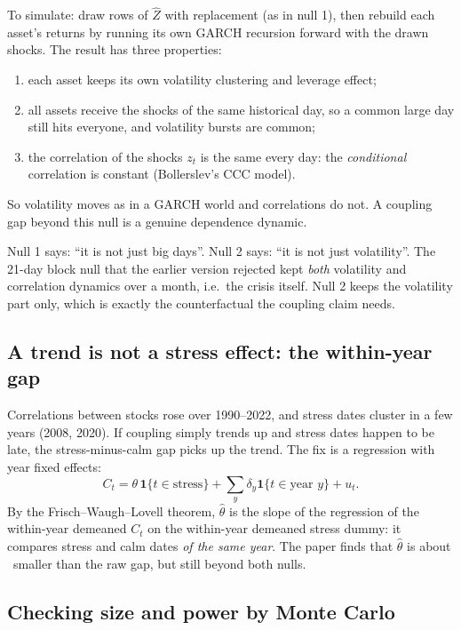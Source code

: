 To simulate: draw rows of $\hat Z$ with replacement (as in null 1), then
rebuild each asset's returns by running its own GARCH recursion forward with
the drawn shocks. The result has three properties:
\begin{enumerate}
\item each asset keeps its own volatility clustering and leverage effect;
\item all assets receive the shocks of the same historical day, so a common
large day still hits everyone, and volatility bursts are common;
\item the correlation of the shocks $z_t$ is the same every day: the
\emph{conditional} correlation is constant (Bollerslev's CCC model).
\end{enumerate}
So volatility moves as in a GARCH world and correlations do not. A coupling
gap beyond this null is a genuine dependence dynamic.

\begin{intuition}
Null 1 says: ``it is not just big days''. Null 2 says: ``it is not just
volatility''. The 21-day block null that the earlier version rejected kept
\emph{both} volatility and correlation dynamics over a month, i.e.\ the crisis
itself. Null 2 keeps the volatility part only, which is exactly the
counterfactual the coupling claim needs.
\end{intuition}

\subsection{A trend is not a stress effect: the within-year gap}

Correlations between stocks rose over 1990--2022, and stress dates cluster in
a few years (2008, 2020). If coupling simply trends up and stress dates happen
to be late, the stress-minus-calm gap picks up the trend. The fix is a
regression with year fixed effects:
\[
C_t=\theta\,\mathbf 1\{t\in\text{stress}\}+\sum_y\delta_y\mathbf 1\{t\in\text{year }y\}+u_t .
\]
By the Frisch--Waugh--Lovell theorem, $\hat\theta$ is the slope of the
regression of the within-year demeaned $C_t$ on the within-year demeaned
stress dummy: it compares stress and calm dates \emph{of the same year}. The
paper finds that $\hat\theta$ is about \FESHRINK\ smaller than the raw gap, but
still beyond both nulls.

\subsection{Checking size and power by Monte Carlo}

